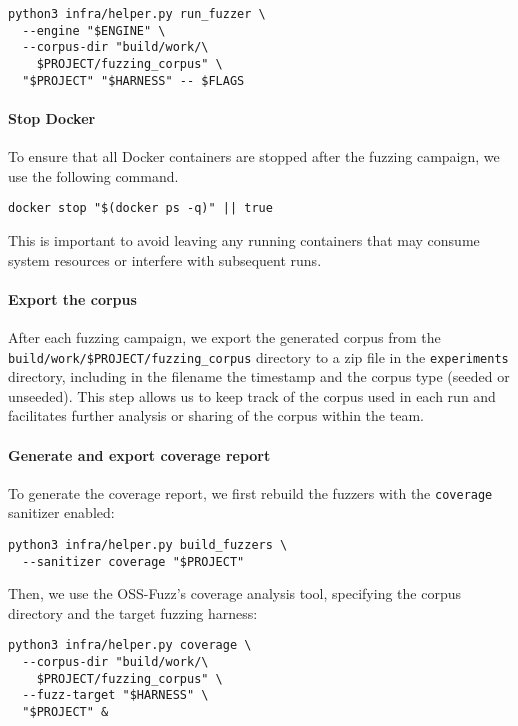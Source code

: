 \documentclass[11pt,a4paper,twocolumn]{article}
\begin{document}
\begin{verbatim}
python3 infra/helper.py run_fuzzer \
  --engine "$ENGINE" \
  --corpus-dir "build/work/\
    $PROJECT/fuzzing_corpus" \
  "$PROJECT" "$HARNESS" -- $FLAGS
    \end{verbatim}

\noindent \paragraph{Stop Docker}

To ensure that all Docker containers are stopped after the fuzzing campaign, we use the following command.

\begin{verbatim}
docker stop "$(docker ps -q)" || true
    \end{verbatim}

This is important to avoid leaving any running containers that may consume system resources or interfere with subsequent runs.

\noindent \paragraph{Export the corpus}

After each fuzzing campaign, we export the generated corpus from the \texttt{build/work/\$PROJECT/fuzzing\_corpus} directory to a zip file in the \texttt{experiments} directory, including in the filename the timestamp and the corpus type (seeded or unseeded). This step allows us to keep track of the corpus used in each run and facilitates further analysis or sharing of the corpus within the team.

\noindent \paragraph{Generate and export coverage report}

To generate the coverage report, we first rebuild the fuzzers with the \texttt{coverage} sanitizer enabled:

\begin{verbatim}
python3 infra/helper.py build_fuzzers \
  --sanitizer coverage "$PROJECT"
\end{verbatim}

Then, we use the OSS-Fuzz's coverage analysis tool, specifying the corpus directory and the target fuzzing harness:

\begin{verbatim}
python3 infra/helper.py coverage \
  --corpus-dir "build/work/\
    $PROJECT/fuzzing_corpus" \
  --fuzz-target "$HARNESS" \
  "$PROJECT" &
    \end{verbatim}
\end{document}
